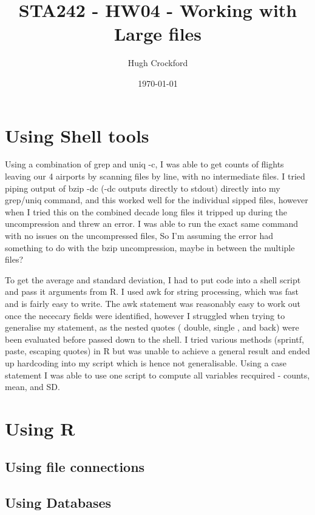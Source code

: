 \documentclass[12pt]{article}
\title{STA242 - HW04 - Working with Large files}
\author{Hugh Crockford}
\date{\today}
\begin{document}
	\maketitle
	\section{Using Shell tools}
		Using a combination of grep and uniq -c, I was able to get counts of flights leaving our 4 airports by scanning files by line, with no intermediate files. 
		I tried piping output of bzip -dc (-dc outputs directly to stdout) directly into my grep/uniq command, and this worked well for the individual sipped files, however when I tried this on the combined decade long files it tripped up during the uncompression and threw an error. I was able to run the exact same command with no issues on the uncompressed files, So I'm assuming the error had something to do with the bzip uncompression, maybe in between the multiple files?
		

		To get the average and standard deviation, I had to put code into a shell script and pass it arguments from R.
		I used awk for string processing, which was fast and is fairly easy to write.
		The awk statement was reasonably easy to work out once the nececary fields were identified, however I struggled when trying to generalise my statement, as the nested quotes ( double, single , and back) were  been evaluated before passed down to the shell.
		I tried various methods (sprintf, paste, escaping quotes) in R but was unable to achieve a general result and ended up hardcoding into my script which is hence not generalisable.
		Using a case statement I was able to use one script to compute all variables recquired - counts, mean, and SD.

	\section{Using R}
		\subsection{Using file connections}
				

		\subsection{Using Databases}
\end{document}

